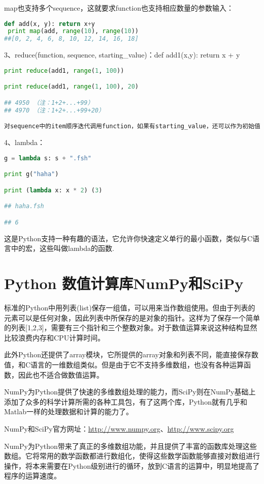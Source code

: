 map也支持多个sequence，这就要求function也支持相应数量的参数输入：
\begin{lstlisting}[language=Python]
def add(x, y): return x+y 
 print map(add, range(10), range(10)) 
##[0, 2, 4, 6, 8, 10, 12, 14, 16, 18]
\end{lstlisting}

3、reduce(function, sequence, starting\_value)：def add1(x,y): return x + y
\begin{lstlisting}[language=Python]
print reduce(add1, range(1, 100))

print reduce(add1, range(1, 100), 20)

## 4950 （注：1+2+...+99）
## 4970 （注：1+2+...+99+20）

对sequence中的item顺序迭代调用function，如果有starting_value，还可以作为初始值调用，例如可以用来对List求和： 
\end{lstlisting}

4、lambda：
\begin{lstlisting}[language=Python]
g = lambda s: s + ".fsh"

print g("haha")

print (lambda x: x * 2) (3)

## haha.fsh

## 6
\end{lstlisting}
这是Python支持一种有趣的语法，它允许你快速定义单行的最小函数，类似与C语言中的宏，这些叫做lambda的函数.



\section{Python 数值计算库NumPy和SciPy}
标准的Python中用列表(list)保存一组值，可以用来当作数组使用。但由于列表的元素可以是任何对象，因此列表中所保存的是对象的指针。这样为了保存一个简单的列表[1,2,3]，需要有三个指针和三个整数对象。对于数值运算来说这种结构显然比较浪费内存和CPU计算时间。

此外Python还提供了array模块，它所提供的array对象和列表不同，能直接保存数值，和C语言的一维数组类似。但是由于它不支持多维数组，也没有各种运算函数，因此也不适合做数值运算。

NumPy为Python提供了快速的多维数组处理的能力，而SciPy则在NumPy基础上添加了众多的科学计算所需的各种工具包，有了这两个库，Python就有几乎和Matlab一样的处理数据和计算的能力了。

NumPy和SciPy官方网址：\url{http://www.numpy.org}、\url{http://www.scipy.org}

NumPy为Python带来了真正的多维数组功能，并且提供了丰富的函数库处理这些数组。它将常用的数学函数都进行数组化，使得这些数学函数能够直接对数组进行操作，将本来需要在Python级别进行的循环，放到C语言的运算中，明显地提高了程序的运算速度。

